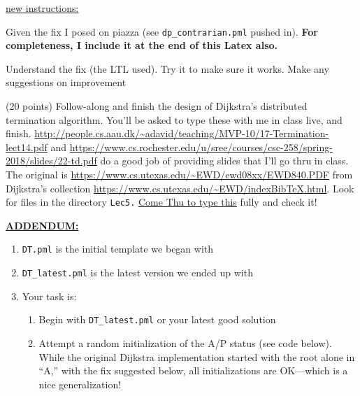 \documentclass[11pt]{article}
\begin{document}
\begin{enumerate}
\begin{compactitem}
\begin{scriptsize}
  \end{scriptsize}

\item \underline{new instructions:}
  \begin{compactitem}
  \item Given the fix I posed on piazza (see {\tt dp\_contrarian.pml} pushed in). {\bf For completeness, I include it at the end of this Latex also.}
  \item Understand the fix (the LTL used). Try it to make sure it works. Make any suggestions on improvement
  \end{compactitem}
  \end{compactitem}
  
\begin{minipage}{\minpagw}
\end{minipage}

\clearpage

\item (20 points) Follow-along and finish the design of
  Dijkstra's distributed termination algorithm.
  You'll be asked to type these with me in class live, and
  finish.
  \url{http://people.cs.aau.dk/~adavid/teaching/MVP-10/17-Termination-lect14.pdf}
  and
  \url{https://www.cs.rochester.edu/u/sree/courses/csc-258/spring-2018/slides/22-td.pdf}
  do a good job of providing slides
  that I'll go thru in class.
  The original is
  \url{https://www.cs.utexas.edu/~EWD/ewd08xx/EWD840.PDF}
  from Dijkstra's collection
  \url{https://www.cs.utexas.edu/~EWD/indexBibTeX.html}.
  Look for files in the directory {\tt Lec5.}
  \underline{Come Thu to type this} fully and check it!

  \underline{\bf ADDENDUM:\/}
  \begin{enumerate}
  \item {\tt DT.pml} is the initial template we began with
  \item  {\tt DT\_latest.pml} is the latest version we ended up with
  \item Your task is:
    \begin{enumerate}
    \item Begin with {\tt DT\_latest.pml} or your latest good solution
    \item Attempt a random initialization of the A/P status (see code below).
      While the original Dijkstra implementation started with the root alone
      in ``A,'' with the fix suggested below, all initializations are OK---which
      is a nice generalization!


\end{enumerate}
\end{enumerate}
\end{enumerate}
\end{document}
